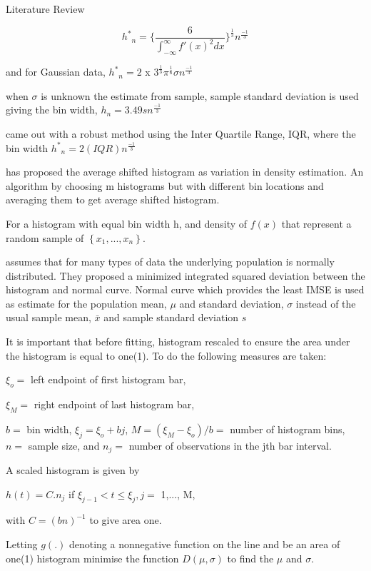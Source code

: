 \documentclass{beamer}
\begin{document}
\begin{frame}[allowframebreaks]{Literature Review}
\begin{itemize}
\begin{equation}
{h^*}_n =         \Bigg\{     \frac{6}{\int_{{-}\infty}^{\infty} {f'}(x)^{2} dx}  \Bigg\}^{\frac{1}{3}}n^{\frac{-1}{3}}
\end{equation}

and for Gaussian data, ${h^*}_n = 2 $ x $ 3^{\frac{1}{3}}\pi^{\frac{1}{6}}\sigma n^{\frac{-1}{3}}$

when $\sigma$ is unknown the estimate from sample, sample standard deviation is used giving the bin width,  $h_n =  3.49s n^{\frac{-1}{3}}$

\cite{Freedman1981} came out with a robust method using the Inter Quartile Range, IQR, where the bin width  ${h^*}_n =  2(IQR) n^{\frac{-1}{3}}$

\cite{Scott1985} has proposed the average shifted histogram as variation in density estimation. An algorithm by choosing m histograms but with different bin locations and averaging them to get average shifted histogram.

For a histogram with equal bin width h, and density of $f(x)$ that represent a random sample of $\left\{ x_1, ...,x_n  \right\}$. 


\cite{Brown1993} assumes that for many types of data the underlying population is normally distributed. They proposed a minimized integrated squared deviation between the histogram and normal curve. Normal curve which provides the least IMSE is used as estimate for the population mean, $\mu$ and standard deviation, $\sigma$  instead of the usual sample mean, $\bar{x}$ and sample standard deviation $s$

It is important that before fitting, histogram rescaled to ensure the area under the histogram is equal to one(1).  To do the following measures are taken:

$\xi_o = $ left endpoint of first histogram bar,

$\xi_M = $ right endpoint of last histogram bar,

$  b = $ bin width, $\xi_j = \xi_o + bj$,
$ M = (\xi_M - \xi_o )/b = $ number of histogram bins,
$ n = $ sample size, and 
$ n_j = $ number of observations in the jth bar interval.

A scaled histogram is given by 

$ h(t) = C.n_j $ if $ \xi_{j-1} < t \leq \xi_j , j = $ 1,..., M, 

with $ C = (bn)^{-1}$ to give area one.

Letting $g(.)$ denoting a nonnegative function on the line and be an area of one(1) histogram \cite{Brown1993} minimise the function $D(\mu, \sigma)$ to find the $\mu$ and $\sigma$.


\end{itemize}
\end{frame}
\end{document}
